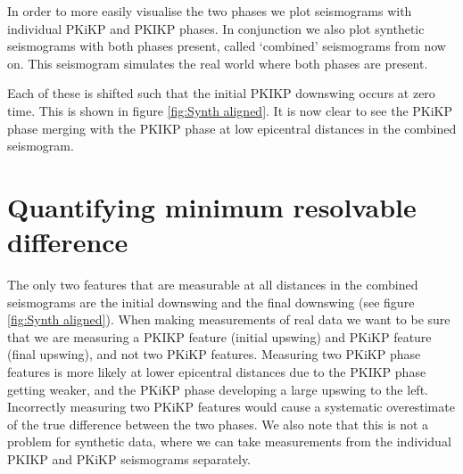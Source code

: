 \documentclass[11pt,a4paper]{article}
\begin{document}
In order to more easily visualise the two phases we plot seismograms with individual PKiKP and PKIKP phases. In conjunction we also plot synthetic seismograms with both phases present, called `combined' seismograms from now on. This seismogram simulates the real world where both phases are present.

Each of these is shifted such that the initial PKIKP downswing occurs at zero time. This is shown in figure \ref{fig:Synth aligned}. It is now clear to see the PKiKP phase merging with the PKIKP phase at low epicentral distances in the combined seismogram.

\section{Quantifying minimum resolvable difference}

The only two features that are measurable at all distances in the combined seismograms are the initial downswing and the final downswing (see figure \ref{fig:Synth aligned}). When making measurements of real data we want to be sure that we are measuring a PKIKP feature (initial upswing) and PKiKP feature (final upswing), and not two PKiKP features. Measuring two PKiKP phase features is more likely at lower epicentral distances due to the PKIKP phase getting weaker, and the PKiKP phase developing a large upswing to the left. Incorrectly measuring two PKiKP features would cause a systematic overestimate of the true difference between the two phases. We also note that this is not a problem for synthetic data, where we can take measurements from the individual PKIKP and PKiKP seismograms separately.
\end{document}
